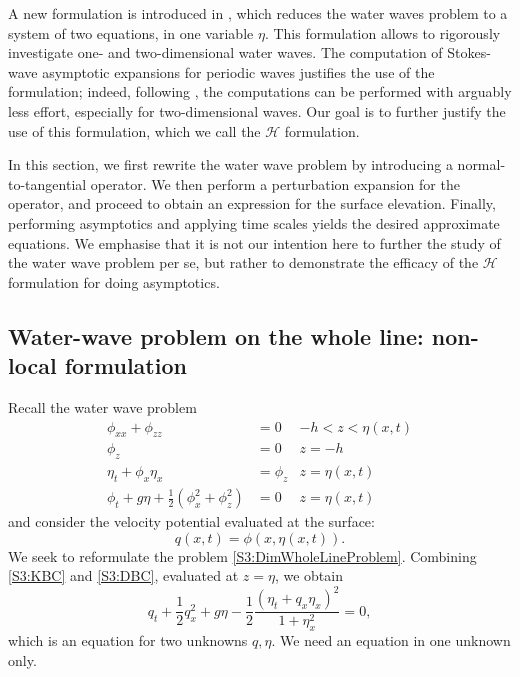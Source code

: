 \documentclass[11pt,reqno,oneside,a4paper]{article}
\begin{document}
A new formulation is introduced in \cite{OV2013}, which reduces the water waves problem to a system of two equations, in one variable $\eta.$ This formulation allows to rigorously investigate one- and two-dimensional water waves. The computation of Stokes-wave asymptotic expansions for periodic waves justifies the use of the formulation; indeed, following \cite{OV2013}, the computations can be performed with arguably less effort, especially for two-dimensional waves. Our goal is to further justify the use of this formulation, which we call the $\mathcal{H}$ formulation.

In this section, we first rewrite the water wave problem by introducing a normal-to-tangential operator. We then perform a perturbation expansion for the operator, and proceed to obtain an expression for the surface elevation. Finally, performing asymptotics and applying time scales yields the desired approximate equations. We emphasise that it is not our intention here to further the study of the water wave problem per se, but rather to demonstrate the efficacy of the $\mathcal{H}$ formulation for doing asymptotics. 

\subsection{Water-wave problem on the whole line: non-local formulation}

Recall the water wave problem 
\begin{subequations} \label{S3:DimWholeLineProblem}
\begin{align}
\phi_{xx} + \phi_{zz} &= 0 &-h < z < \eta(x,t) \label{S3:PDE}\\
\phi_{z} &= 0 &z = -h \label{S3:BBC}\\
\eta_t + \phi_{x}\eta_{x} &= \phi_{z} & z = \eta(x,t) \label{S3:KBC}\\
\phi_t + g\eta + \frac{1}{2}(\phi_{x}^2 + \phi_{z}^2) &= 0 &z = \eta(x,t) \label{S3:DBC}
\end{align}
\end{subequations}
and consider the velocity potential evaluated at the surface:
\[ 
q(x,t ) = \phi (x, \eta(x, t)).
\]
We seek to reformulate the problem \eqref{S3:DimWholeLineProblem}. Combining \eqref{S3:KBC} and \eqref{S3:DBC}, evaluated at $z = \eta$, we obtain 
\begin{equation}\label{S3:eq1}
q_t + \frac{1}{2}q_x^2 + g \eta - \frac{1}{2} \frac{(\eta_t + q_x \eta_x)^2}{1 + \eta_x^2} = 0,
\end{equation}
which is an equation for two unknowns $q ,\eta.$ We need an equation in one unknown only. 
\end{document}
